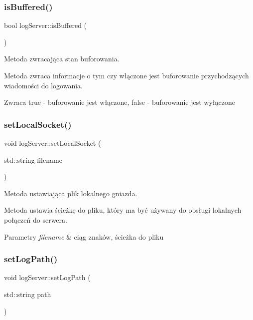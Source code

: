 \subsubsection{\texorpdfstring{is\+Buffered()}{isBuffered()}}
{\footnotesize\ttfamily bool log\+Server\+::is\+Buffered (\begin{DoxyParamCaption}{ }\end{DoxyParamCaption})}



Metoda zwracająca stan buforowania. 

Metoda zwraca informacje o tym czy włączone jest buforowanie przychodzących wiadomości do logowania.

\begin{DoxyReturn}{Zwraca}
true -\/ buforowanie jest włączone, false -\/ buforowanie jest wyłączone 
\end{DoxyReturn}
\mbox{\label{classlog_server_afbafe39a17024928f9b807e01ab5d592}} 
\subsubsection{\texorpdfstring{set\+Local\+Socket()}{setLocalSocket()}}
{\footnotesize\ttfamily void log\+Server\+::set\+Local\+Socket (\begin{DoxyParamCaption}\item[{std\+::string}]{filename }\end{DoxyParamCaption})}



Metoda ustawiająca plik lokalnego gniazda. 

Metoda ustawia ścieżkę do pliku, który ma być używany do obsługi lokalnych połączeń do serwera.


\begin{DoxyParams}{Parametry}
{\em filename} & ciąg znaków, ścieżka do pliku \\
\hline
\end{DoxyParams}
\mbox{\label{classlog_server_ac5dfb2bbf7b156d05b07502081abc573}} 
\subsubsection{\texorpdfstring{set\+Log\+Path()}{setLogPath()}}
{\footnotesize\ttfamily void log\+Server\+::set\+Log\+Path (\begin{DoxyParamCaption}\item[{std\+::string}]{path }\end{DoxyParamCaption})}



